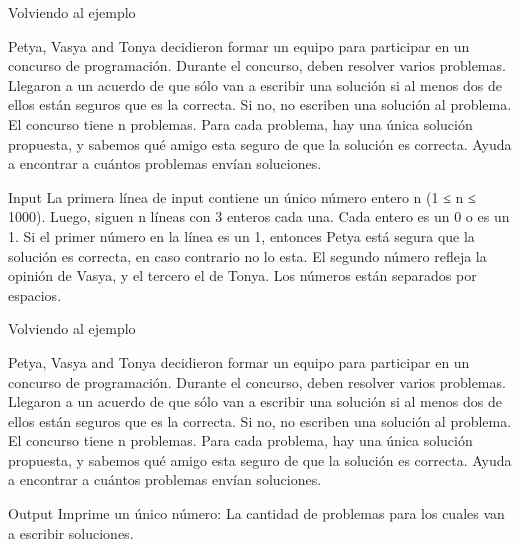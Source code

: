 \documentclass{beamer}
\begin{document}
\begin{frame} {Volviendo al ejemplo}
  \begin{block}{}
 Petya, Vasya and Tonya decidieron formar un equipo para participar en un concurso de programación. Durante el concurso, deben resolver varios problemas. Llegaron a un acuerdo de que sólo van a escribir una solución si al menos dos de ellos están seguros que es la correcta. Si no, no escriben una solución al problema.
  El concurso tiene n problemas. Para cada problema, hay una única solución propuesta, y sabemos qué amigo esta seguro de que la solución es correcta. Ayuda a encontrar a cuántos problemas envían soluciones.\\
  \end{block}
  
  \begin{block}{Input}
  La primera línea de input contiene un único número entero n (1 ≤ n ≤ 1000). Luego, siguen n líneas con 3 enteros cada una. Cada entero es un 0 o es un 1. Si el primer número en la línea es un 1, entonces Petya está segura que la solución es correcta, en caso contrario no lo esta. El segundo número refleja la opinión de Vasya, y el tercero el de Tonya. Los números están separados por espacios.\\
  \end{block}
  
\end{frame}

\begin{frame} {Volviendo al ejemplo}
  \begin{block}{}
 Petya, Vasya and Tonya decidieron formar un equipo para participar en un concurso de programación. Durante el concurso, deben resolver varios problemas. Llegaron a un acuerdo de que sólo van a escribir una solución si al menos dos de ellos están seguros que es la correcta. Si no, no escriben una solución al problema.
  El concurso tiene n problemas. Para cada problema, hay una única solución propuesta, y sabemos qué amigo esta seguro de que la solución es correcta. Ayuda a encontrar a cuántos problemas envían soluciones.\\
  \end{block}
   
  \begin{block}{Output}
  Imprime un único número: La cantidad de problemas para los cuales van a escribir soluciones.

  \end{block}
\end{frame}
\end{document}
